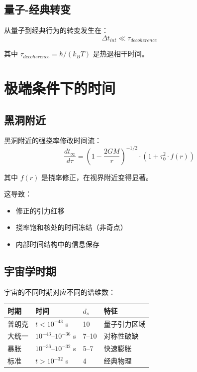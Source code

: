 \subsection{量子-经典转变}

从量子到经典行为的转变发生在：
\begin{equation}
    \Delta t_{int} \ll \tau_{decoherence}
\end{equation}

其中 $\tau_{decoherence} = \hbar/(k_B T)$ 是热退相干时间。

\section{极端条件下的时间}

\subsection{黑洞附近}

黑洞附近的强挠率修改时间流：
\begin{equation}
    \frac{dt_{\infty}}{d\tau} = \left(1 - \frac{2GM}{r}\right)^{-1/2} \cdot (1 + \tau_0^2 \cdot f(r))
\end{equation}

其中 $f(r)$ 是挠率修正，在视界附近变得显著。

这导致：
\begin{itemize}
    \item 修正的引力红移
    \item 挠率饱和核处的时间冻结（非奇点）
    \item 内部时间结构中的信息保存
\end{itemize}

\subsection{宇宙学时期}

宇宙的不同时期对应不同的谱维数：

\begin{center}
\begin{tabular}{llll}
\hline
时期 & 时间 & $d_s$ & 特征 \\ \hline
普朗克 & $t < 10^{-43}$ s & 10 & 量子引力区域 \\
大统一 & $10^{-43}$--$10^{-36}$ s & 7--10 & 对称性破缺 \\
暴胀 & $10^{-36}$--$10^{-32}$ s & 5--7 & 快速膨胀 \\
标准 & $t > 10^{-32}$ s & 4 & 经典物理 \\
\hline
\end{tabular}
\end{center}

